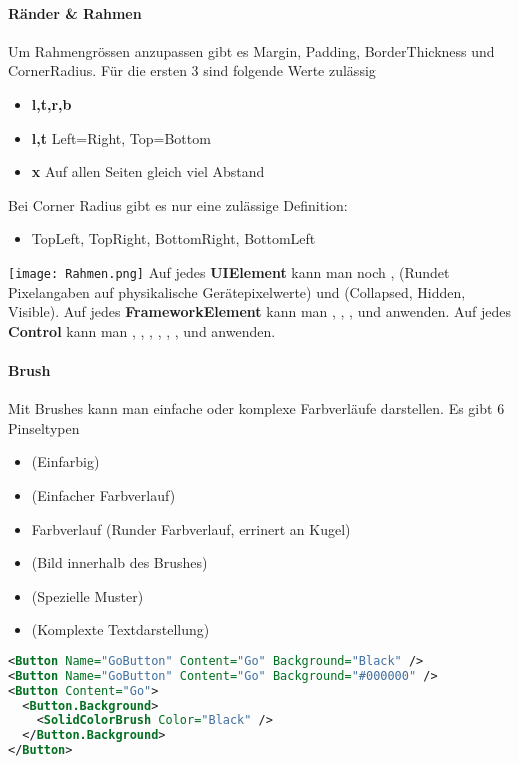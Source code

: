 \paragraph{Ränder \& Rahmen} Um Rahmengrössen anzupassen gibt es Margin, Padding, BorderThickness und CornerRadius. Für die ersten 3 sind folgende Werte zulässig
\begin{itemize}
\item \textbf{l,t,r,b}
\item \textbf{l,t} Left=Right, Top=Bottom
\item \textbf{x} Auf allen Seiten gleich viel Abstand
\end{itemize}
Bei Corner Radius gibt es nur eine zulässige Definition:
\begin{itemize}
\item TopLeft, TopRight, BottomRight, BottomLeft
\end{itemize}
\texttt{[image: Rahmen.png]}
Auf jedes \textbf{UIElement} kann man noch ,  (Rundet Pixelangaben auf physikalische Gerätepixelwerte) und  (Collapsed, Hidden, Visible). Auf jedes \textbf{FrameworkElement} kann man , , ,  und  anwenden. Auf jedes \textbf{Control} kann man , , , , , ,  und  anwenden.

\paragraph{Brush} Mit Brushes kann man einfache oder komplexe Farbverläufe darstellen. Es gibt 6 Pinseltypen
\begin{itemize}
\item {} (Einfarbig)
\item {} (Einfacher Farbverlauf)
\item {} Farbverlauf (Runder Farbverlauf, errinert an Kugel)
\item {} (Bild innerhalb des Brushes)
\item {} (Spezielle Muster)
\item {} (Komplexte Textdarstellung)
\end{itemize}

\begin{lstlisting}[language=xml]
<Button Name="GoButton" Content="Go" Background="Black" />
<Button Name="GoButton" Content="Go" Background="#000000" />
<Button Content="Go">
  <Button.Background>
    <SolidColorBrush Color="Black" />
  </Button.Background>
</Button>
\end{lstlisting}

